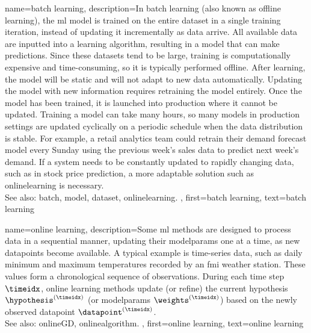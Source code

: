 {name={batch learning},
	description={In \gls{batch} learning (also known as offline learning), the \gls{ml} \gls{model} 
		is trained on the entire \gls{dataset} in a single training iteration, instead of updating it incrementally as \gls{data} arrive. 
		All available \gls{data} are inputted into a learning \gls{algorithm}, resulting in a \gls{model} that can make \glspl{prediction}. 
		Since these \glspl{dataset} tend to be large, training is computationally expensive and time-consuming, 
		so it is typically performed offline. After learning, the \gls{model} will be static and will not adapt to new \gls{data} automatically. 
		Updating the \gls{model} with new information requires retraining the \gls{model} entirely. Once the \gls{model} has been trained, 
		it is launched into production where it cannot be updated. Training a \gls{model} can take many hours, so many \glspl{model} in production 
		settings are updated cyclically on a periodic schedule when the \gls{data} distribution is stable. For example, a retail analytics team 
		could retrain their demand forecast \gls{model} every Sunday using the previous week's sales \gls{data} to predict next week's demand. 
		If a system needs to be constantly updated to rapidly changing \gls{data}, such as in stock price \gls{prediction}, a more adaptable solution 
		such as \gls{onlinelearning} is necessary.
		\\
		See also: \gls{batch}, \gls{model}, \gls{dataset}, \gls{onlinelearning}. },
	first={batch learning}, 
	text={batch learning}
}

{name={online learning},
	description={Some \gls{ml} methods  are designed to process \gls{data} in a sequential 
		manner, updating their \glspl{modelparam} one at a time, as new \glspl{datapoint} become available. 
		A typical example is time-series \gls{data}, such as daily \gls{minimum} and \gls{maximum} temperatures 
		recorded by an \gls{fmi} weather station. These values form a chronological sequence 
		of observations. During each time step $\timeidx$, online learning methods update (or refine)  
		the current \gls{hypothesis} $\hypothesis^{(\timeidx)}$ (or \glspl{modelparam} $\weights^{(\timeidx)}$) 
		based on the newly observed \gls{datapoint} $\datapoint^{(\timeidx)}$. 
		\\ 
		See also: \gls{onlineGD}, \gls{onlinealgorithm}. },
	first={online learning},
	text={online learning} 
}

